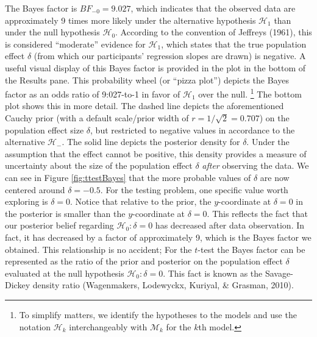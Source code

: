 \documentclass[english,,doc,floatsintext]{apa6}
\let\rmarkdownfootnote\footnote%
\def\footnote{\protect\rmarkdownfootnote}
\begin{document}
The Bayes factor is \(BF_{-0}=9.027\), which indicates that the observed data are approximately 9 times more likely under the alternative hypothesis \(\mathcal{H}_{1}\) than under the null hypothesis \(\mathcal{H}_{0}\). According to the convention of Jeffreys (1961), this is considered \enquote{moderate} evidence for \(\mathcal{H}_{1}\), which states that the true population effect \(\delta\) (from which our participants' regression slopes are drawn) is negative. A useful visual display of this Bayes factor is provided in the plot in the bottom of the Results pane. This probability wheel (or \enquote{pizza plot}) depicts the Bayes factor as an odds ratio of 9:027-to-1 in favor of \(\mathcal{H}_{1}\) over the null.
\footnote{To simplify matters, we identify the hypotheses to the models and use the notation \( \mathcal{H}_{k} \) interchangeably with \( \mathcal{M}_{k} \) for the \( k \)th model.}
The bottom plot shows this in more detail. The dashed line depicts the aforementioned Cauchy prior (with a default scale/prior width of \(r=1/\sqrt{2} = 0.707\)) on the population effect size \(\delta\), but restricted to negative values in accordance to the alternative \(\mathcal{H}_{-}\). The solid line depicts the posterior density for \(\delta\). Under the assumption that the effect cannot be positive, this density provides a measure of uncertainty about the size of the population effect \(\delta\) \emph{after} observing the data. We can see in Figure \ref{fig:ttestBayes} that the more probable values of \(\delta\) are now centered around \(\delta = -0.5\). For the testing problem, one specific value worth exploring is \(\delta=0\). Notice that relative to the prior, the \(y\)-coordinate at \(\delta=0\) in the posterior is smaller than the \(y\)-coordinate at \(\delta=0\). This reflects the fact that our posterior belief regarding \(\mathcal{H}_{0} : \delta = 0\) has decreased after data observation. In fact, it has decreased by a factor of approximately 9, which is the Bayes factor we obtained. This relationship is no accident; For the \(t\)-test the Bayes factor can be represented as the ratio of the prior and posterior on the population effect \(\delta\) evaluated at the null hypothesis \(\mathcal{H}_{0}: \delta = 0\). This fact is known as the Savage-Dickey density ratio (Wagenmakers, Lodewyckx, Kuriyal, \& Grasman, 2010).
\end{document}
